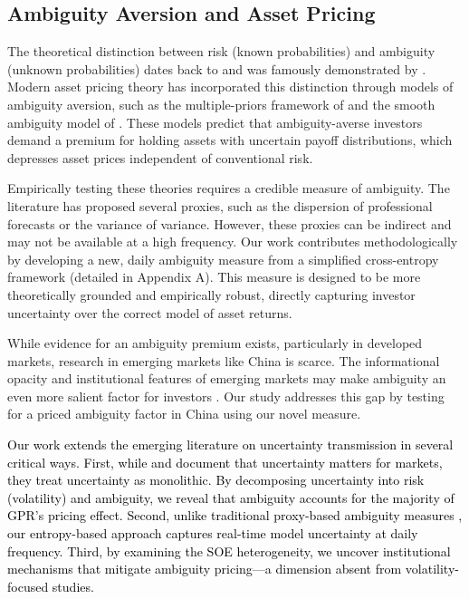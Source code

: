 \documentclass[preprint,12pt,authoryear]{elsarticle}
\begin{document}
\subsection{Ambiguity Aversion and Asset Pricing}

The theoretical distinction between risk (known probabilities) and ambiguity (unknown probabilities) dates back to \citet{Knight1921} and was famously demonstrated by \citet{Ellsberg1961}. Modern asset pricing theory has incorporated this distinction through models of ambiguity aversion, such as the multiple-priors framework of \citet{Gilboa1989} and the smooth ambiguity model of \citet{Klibanoff2005}. These models predict that ambiguity-averse investors demand a premium for holding assets with uncertain payoff distributions, which depresses asset prices independent of conventional risk.

Empirically testing these theories requires a credible measure of ambiguity. The literature has proposed several proxies, such as the dispersion of professional forecasts \citep{Brenner2018, Ulrich2013} or the variance of variance. However, these proxies can be indirect and may not be available at a high frequency. Our work contributes methodologically by developing a new, daily ambiguity measure from a simplified cross-entropy framework (detailed in Appendix A). This measure is designed to be more theoretically grounded and empirically robust, directly capturing investor uncertainty over the correct model of asset returns.

While evidence for an ambiguity premium exists, particularly in developed markets, research in emerging markets like China is scarce. The informational opacity and institutional features of emerging markets may make ambiguity an even more salient factor for investors \citep{Easley2009}. Our study addresses this gap by testing for a priced ambiguity factor in China using our novel measure.

\textcolor{black}{Our work extends the emerging literature on uncertainty transmission in several critical ways. First, while \citet{Baker2016} and \citet{Caldara2022} document that uncertainty matters for markets, they treat uncertainty as monolithic. By decomposing uncertainty into risk (volatility) and ambiguity, we reveal that ambiguity accounts for the majority of GPR's pricing effect. Second, unlike traditional proxy-based ambiguity measures \citep{Brenner2018}, our entropy-based approach captures real-time model uncertainty at daily frequency. Third, by examining the SOE heterogeneity, we uncover institutional mechanisms that mitigate ambiguity pricing---a dimension absent from volatility-focused studies.}
\end{document}
